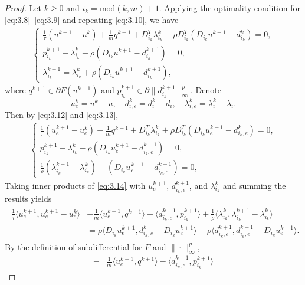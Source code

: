 \documentclass{article}
\theoremstyle{definition}
\begin{document}
\begin{proof}
Let $k\geq 0$ and $i_k=\mbox{mod}(k,m)+1$.
Applying the optimality condition for \eqref{eq:3.8}--\eqref{eq:3.9} and repeating \eqref{eq:3.10}, we have
\begin{align}\label{eq:3.13}
  \begin{cases}
    \frac{1}{\tau}(u^{k+1}-u^k)+\frac{1}{m} q^{k+1}+D_{i_k}^T\lambda_{i_k}^k+\rho D_{i_k}^T(D_{i_k}u^{k+1}-d_{i_k}^{k}) =0,\\
    p_{i_k}^{k+1}-\lambda_{i_k}^k-\rho(D_{i_k}u^{k+1}-d_{i_k}^{k+1})=0,\\
    \lambda^{k+1}_{i_k}=\lambda_{i_k}^{k}+\rho(D_{i_k}u^{k+1}-d_{i_k}^{k+1}),
  \end{cases}
\end{align}
where $q^{k+1}\in \partial F(u^{k+1})$ and $p_{i_k}^{k+1}\in \partial \|d_{i_k}^{k+1}\|_\infty^p$.
Denote
\[
u^k_e=u^k-\bar{u},\quad
d^k_{i,e}=d^k_i - \bar{d}_i,\quad
\lambda^k_{i,e}=\lambda^k_i - \bar{\lambda}_i.
\]
Then by \eqref{eq:3.12} and \eqref{eq:3.13},
\begin{align}\label{eq:3.14}
  \begin{cases}
    \frac{1}{\tau}(u^{k+1}_e-u^k_e)+\frac{1}{m} q^{k+1}+D_{i_k}^T\lambda_{i_k}^k+\rho D_{i_k}^T(D_{i_k}u^{k+1}_e-d_{i_k,e}^{k}) =0,\\
    p_{i_k}^{k+1}-\lambda_{i_k}^k-\rho(D_{i_k}u^{k+1}_e-d_{i_k,e}^{k+1})=0,\\
    \frac{1}{\rho}(\lambda^{k+1}_{i_k}-\lambda_{i_k}^{k})-(D_{i_k}u_e^{k+1}-d_{i_k,e}^{k+1})=0,
  \end{cases}
\end{align}
Taking inner products of \eqref{eq:3.14} with $u_e^{k+1}$, $d_{i_k,e}^{k+1}$, and $\lambda_{i_k}^{k}$ and summing the results yields
\begin{align}\label{eq:3.15}
\begin{split}
  \frac{1}{\tau}\langle u_e^{k+1}, u_e^{k+1}-u_e^k\rangle
  &+\frac{1}{m}\langle u_e^{k+1}, q^{k+1}\rangle
  +\langle d_{i_k,e}^{k+1}, p_{i_k}^{k+1}\rangle
  +\frac{1}{\rho}\langle\lambda^{k}_{i_k}, \lambda^{k+1}_{i_k}-\lambda^{k}_{i_k} \rangle\\
   &=\rho \langle D_{i_k}u_e^{k+1},  d_{i_k,e}^{k}-D_{i_k}u_e^{k+1}\rangle
   -\rho \langle d_{i_k,e}^{k+1},  d_{i_k,e}^{k+1}-D_{i_k}u_e^{k+1}\rangle.
\end{split}
\end{align}
By the definition of subdifferential for $F$ and $\|\cdot\|_\infty^p$,
\begin{align*}
    -&\frac{1}{m}\langle u_e^{k+1}, q^{k+1}\rangle
    -\langle d_{i_k,e}^{k+1}, p_{i_k}^{k+1}\rangle

\end{align*}
\end{proof}
\end{document}
